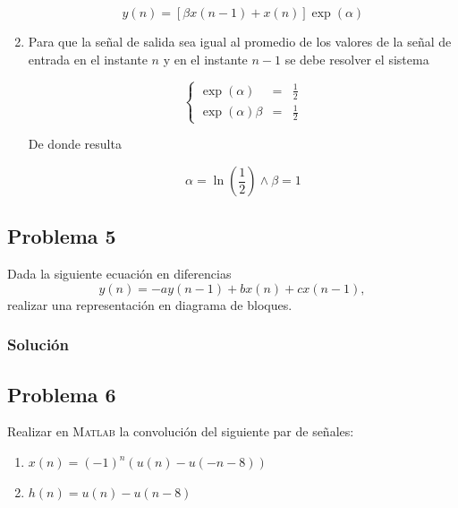 \documentclass[a4paper,12pt,final]{article}
\begin{document}
\begin{enumerate}[label=\alph*)]
          $$y\left(n\right) = \left[\beta x\left(n-1\right) + x\left(n\right)\right]\exp\left(\alpha\right)$$

        \item Para que la señal de salida sea igual al promedio de los valores de la señal de entrada en el instante $n$
          y en el instante $n-1$ se debe resolver el sistema

          \begin{equation}
            \left\{
              \begin{array}{ccc}
                \exp\left(\alpha\right)      &=&  \displaystyle{\frac{1}{2}} \\[1em]
                \exp\left(\alpha\right)\beta &=&  \displaystyle{\frac{1}{2}}
              \end{array}
            \right.
          \end{equation}

          \noindent De donde resulta

          $$ \alpha = \ln\left(\frac{1}{2}\right) \wedge \beta = 1$$
      \end{enumerate}

  \newpage
  \subsection*{Problema 5}
    \noindent Dada la siguiente ecuación en diferencias
    $$y\left(n\right) = -a y\left(n-1\right) + b x\left(n\right) + c x\left(n-1\right),$$
    realizar una representación en diagrama de bloques.

    \subsubsection*{Solución}

  \newpage
  \subsection*{Problema 6}
    \noindent Realizar en \textsc{Matlab} la convolución del siguiente par de
    señales:

    \begin{enumerate}
        \item $x\left(n\right) = \left(-1\right)^n \left(u\left(n\right) - u\left(-n-8\right)\right)$
        \item $h\left(n\right) = u\left(n\right) - u\left(n-8\right)$
    \end{enumerate}
\end{document}

